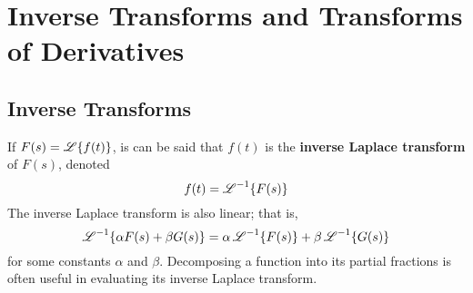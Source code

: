 \documentclass[./Differential Equations.tex]{subfiles}
\begin{document}
	\section{Inverse Transforms and Transforms of Derivatives}
		\subsection{Inverse Transforms}
				If \(F(s) = \operatorname{\mathscr{L}}\{f(t)\}\), is can be said that \(f(t)\) is the \textbf{inverse Laplace transform} of \(F(s)\), denoted
					\[f(t) = \operatorname{\mathscr{L}}^{-1}\{F(s)\}\]
				The inverse Laplace transform is also linear; that is,
					\[\operatorname{\mathscr{L}}^{-1}\{\alpha F(s) + \beta G(s)\} = \alpha\operatorname{\mathscr{L}}^{-1}\{F(s)\} + \beta\operatorname{\mathscr{L}}^{-1}\{G(s)\}\]
					for some constants \(\alpha\) and \(\beta\).
				Decomposing a function into its partial fractions is often useful in evaluating its inverse Laplace transform. 
\end{document}
